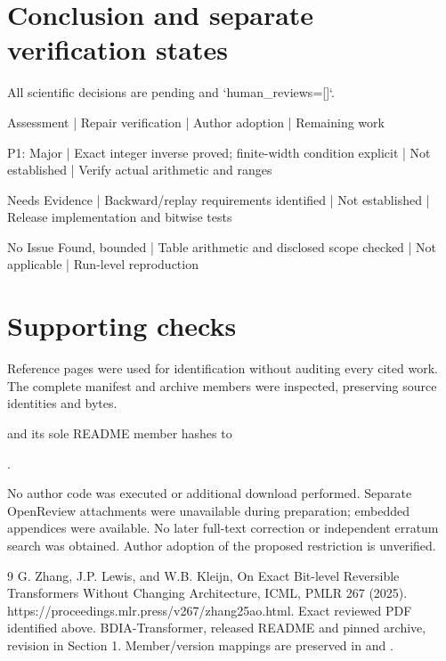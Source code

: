 \documentclass[10pt]{article}
\begin{document}
\section*{Conclusion and separate verification states}
All scientific decisions are pending and `human\_reviews=[]`.\par
Assessment | Repair verification | Author adoption | Remaining work\par
P1: Major | Exact integer inverse proved; finite-width condition explicit | Not established | Verify actual arithmetic and ranges\par
Needs Evidence | Backward/replay requirements identified | Not established | Release implementation and bitwise tests\par
No Issue Found, bounded | Table arithmetic and disclosed scope checked | Not applicable | Run-level reproduction\par
\section*{Supporting checks}
Reference pages were used for identification without auditing every cited work. The complete manifest and archive members were inspected, preserving source identities and bytes.\par
and its sole README member hashes to\par
.\par
No author code was executed or additional download performed. Separate OpenReview attachments were unavailable during preparation; embedded appendices were available. No later full-text correction or independent erratum search was obtained. Author adoption of the proposed restriction is unverified.\par
9 G. Zhang, J.P. Lewis, and W.B. Kleijn, On Exact Bit-level Reversible Transformers Without Changing Architecture, ICML, PMLR 267 (2025). https://proceedings.mlr.press/v267/zhang25ao.html. Exact reviewed PDF identified above. BDIA-Transformer, released README and pinned archive, revision in Section 1. Member/version mappings are preserved in and .\par
\end{document}
